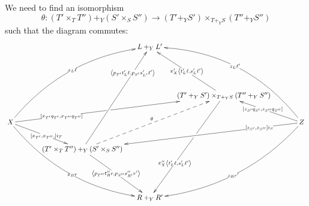 \documentclass[12pt]{article}
\newcommand{\from}{\colon}
\renewcommand{\(}{\left(}
\renewcommand{\)}{\right)}
\renewcommand{\{}{\left\lbrace}
\renewcommand{\}}{\right\rbrace}
\theoremstyle{remark}
\theoremstyle{definition}
\begin{document}
We need to find an isomorphism
\[
	\theta \from (T' \times_T T'') +_Y (S' \times_S S'') \to (T' +_Y S') \times_{T +_Y S} (T'' +_Y S'')	
\]
such that the diagram commutes:
\begin{equation} \label{Diag:InterchangeLaw}
	\xymatrix@C=.5cm{
		{} &
		{} &
		{} &
		L +_Y L' &
		{} &
		{} &
		{} \\
		{} &
		{} &
		{} &
		{} &
		{} &
		{} &
		{} \\
		{} &
		{} &
		{} &
		{} &
		(T' +_Y S') \times_{T +_Y S} (T'' +_Y S'') 
			\ar[luu]|{\pi'_X \left\langle t'_L\ell, s'_L\ell' \right\rangle}
			\ar[ldddd]
				|(.39)\hole
				|>>>>>>>>>>>>>>>>>>{ \pi''_X \left\langle t'_L\ell, s'_L\ell' \right\rangle }  &
		{} &
		{} \\
		X 
			\ar@/^2pc/[rrruuu]|{x_L \ell} 
			\ar[rrrru]
				|<<<<<<<<<<<<<<<<<<<<<<<{ \left[ x_{T'}q_{T'}, x_{T''}q_{T''} \right] } 
				|(.46)\hole
			\ar[rrd]|{ \left[ x_{T'},x_{T''}, \right] i_T }
			\ar@/_2pc/[rrrddd]|{x_R r} &
		{} &
		{} &
		{} &
		{} &
		{} &
		Z 
			\ar@/_2.5pc/[llluuu]|{z_L \ell'}
			\ar[llu]|{ \left[ z_{S'}q_{S'},z_{S''}q_{S''} \right] } 
			\ar[lllld]|<<<<<<<<<<<<<<<<<<<{ \left[ z_{S'},z_{S''} \right] i_S  }
			\ar@/^2pc/[lllddd]|{z_R r'} \\
		{} &
		{} &
		(T' \times_T T'') +_Y (S' \times_S S'') 
			\ar[ruuuu]|>>>>>>>>>>>>>{ \left\langle p_{T'}t'_L\ell, p_{S'} s'_{L'}\ell' \right\rangle }
			\ar@{-->}[rruu]^{\theta}
			\ar[rdd]|{ \left\langle p_{T''} t''_Rr, p_{S''}s''_{R'}r' \right\rangle  } &
		{} &
		{} &
		{} &
		{} \\
		{} &
		{} &
		{} &
		{} &
		{} &
		{} &
		{} \\
		{} &
		{} &
		{} &
		R +_Y R' &
		{} &
		{} &
		{} 
}
\end{equation}
 
\end{document}

